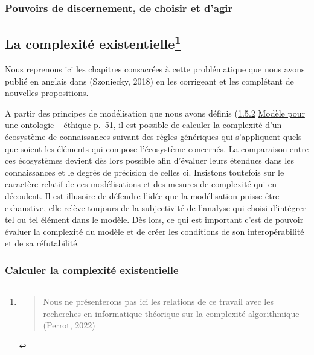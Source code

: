 \documentclass[
  letterpaper,
  DIV=11,
  numbers=noendperiod]{scrreprt}
\begin{document}
\hypertarget{pouvoirs-de-discernement-de-choisir-et-dagir}{%
\subsubsection{Pouvoirs de discernement, de choisir et
d'agir}\label{pouvoirs-de-discernement-de-choisir-et-dagir}}

\hypertarget{sec-complexiteExitentielle}{%
\subsection[La complexité existentielle]{\texorpdfstring{La complexité
existentielle\footnote{\begin{quote}
  Nous ne présenterons pas ici les relations de ce travail avec les
  recherches en informatique théorique sur la complexité algorithmique
  (Perrot, 2022)
  \end{quote}}}{La complexité existentielle}}\label{sec-complexiteExitentielle}}

Nous reprenons ici les chapitres consacrées à cette problématique que
nous avons publié en anglais dans (Szoniecky, 2018) en les corrigeant et
les complétant de nouvelles propositions.

A partir des principes de modélisation que nous avons définis
(\protect\hyperlink{anchor-18}{1.5.2}
\protect\hyperlink{anchor-18}{Modèle pour une ontologie -- éthique}
p.~\protect\hyperlink{anchor-18}{51}, il est possible de calculer la
complexité d'un écosystème de connaissances suivant des règles
génériques qui s'appliquent quels que soient les éléments qui compose
l'écosystème concernés. La comparaison entre ces écosystèmes devient dès
lors possible afin d'évaluer leurs étendues dans les connaissances et le
degrés de précision de celles ci. Insistons toutefois sur le caractère
relatif de ces modélisations et des mesures de complexité qui en
découlent. Il est illusoire de défendre l'idée que la modélisation
puisse être exhaustive, elle relève toujours de la subjectivité de
l'analyse qui choisi d'intégrer tel ou tel élément dans le modèle. Dès
lors, ce qui est important c'est de pouvoir évaluer la complexité du
modèle et de créer les conditions de son interopérabilité et de sa
réfutabilité.

\hypertarget{calculer-la-complexituxe9-existentielle}{%
\subsubsection{Calculer la complexité
existentielle}\label{calculer-la-complexituxe9-existentielle}}
\end{document}
